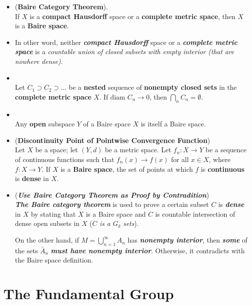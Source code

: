 \documentclass[11pt]{article}
\begin{document}
\begin{itemize}
\item \begin{theorem} (\textbf{Baire Category Theorem}).  \citep{munkres2000topology} \\
If $X$ is a \textbf{compact Hausdorff} space or a \textbf{complete metric space}, then $X$ is a \textbf{Baire space}.
\end{theorem}

\item \begin{remark}
In other word,  neither \textbf{\emph{compact Hausdorff}} space or a \textbf{\emph{complete metric space}} is a \emph{countable union of closed subsets with empty interior (that are nowhere dense)}.
\end{remark}

\item \begin{lemma}\citep{munkres2000topology} \\
Let $C_1 \supset C_2 \supset \ldots$ be a \textbf{nested} sequence of \textbf{nonempty closed sets} in the \textbf{complete metric space} $X$. If $\text{diam }C_n \rightarrow 0$, then $\bigcap_{n}C_n  = \emptyset$.
\end{lemma}

\item \begin{lemma} \citep{munkres2000topology} \\
Any \textbf{open} subspace $Y$ of a Baire space $X$ is itself a Baire space.
\end{lemma}

\item \begin{theorem} (\textbf{Discontinuity Point of Pointwise Convergence Function}) \citep{munkres2000topology} \\
Let $X$ be a space; let $(Y, d)$ be a metric space. Let $f_n : X \rightarrow Y$ be a sequence of continuous functions such that $f_n(x) \rightarrow f(x)$ for all $x \in X$, where $f : X \rightarrow Y$. If $X$ is a \textbf{Baire space}, the set of points at which $f$ is \textbf{continuous} is \textbf{dense} in $X$.
\end{theorem}

\item \begin{remark} (\textbf{\emph{Use Baire Category Theorem as Proof by Contradition}})\\
\emph{\textbf{The Baire category theorem}} is used to prove a certain subset $C$ is \emph{\textbf{dense}} in $X$ by stating that $X$ is a Baire space and $C$ is countable intersection of dense open subsets in $X$ (\emph{$C$ is a $G_{\delta}$ sets}). 

On the other hand, if $M =  \bigcup_{n=1}^{\infty}A_n$ has \emph{\textbf{nonempty interior}}, then \emph{\textbf{some}} of the  sets $\bar{A}_n$ \emph{\textbf{must have nonempty interior}}. Otherwise, it contradicts with the Baire space definition.
\end{remark}
\end{itemize}
\section{The Fundamental Group}

\newpage


\end{document}

